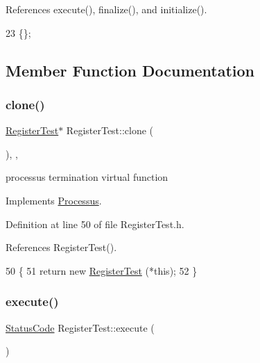 References execute(), finalize(), and initialize().


\begin{DoxyCode}
23 \{\}; 
\end{DoxyCode}


\subsection{Member Function Documentation}
\mbox{\label{classRegisterTest_a05c7318198562df874c8d7ab5d0e9f89}} 
\subsubsection{\texorpdfstring{clone()}{clone()}}
{\footnotesize\ttfamily \hyperlink{classRegisterTest}{Register\+Test}$\ast$ Register\+Test\+::clone (\begin{DoxyParamCaption}{ }\end{DoxyParamCaption})\hspace{0.3cm}{\ttfamily [inline]}, {\ttfamily [protected]}, {\ttfamily [virtual]}}

processus termination virtual function 

Implements \hyperlink{classProcessus_aca8856f6d6d7b7e1fe941f298dcbb502}{Processus}.



Definition at line 50 of file Register\+Test.\+h.



References Register\+Test().


\begin{DoxyCode}
50                        \{
51     \textcolor{keywordflow}{return} \textcolor{keyword}{new} \hyperlink{classRegisterTest_a0c77058c104d6249d884d864a4f61524}{RegisterTest} (*\textcolor{keyword}{this});
52   \}
\end{DoxyCode}
\mbox{\label{classRegisterTest_aa1a19b0cd0e0f2d8a47913521ae259a4}} 
\subsubsection{\texorpdfstring{execute()}{execute()}}
{\footnotesize\ttfamily \hyperlink{classStatusCode}{Status\+Code} Register\+Test\+::execute (\begin{DoxyParamCaption}{ }\end{DoxyParamCaption})\hspace{0.3cm}{\ttfamily [virtual]}}

